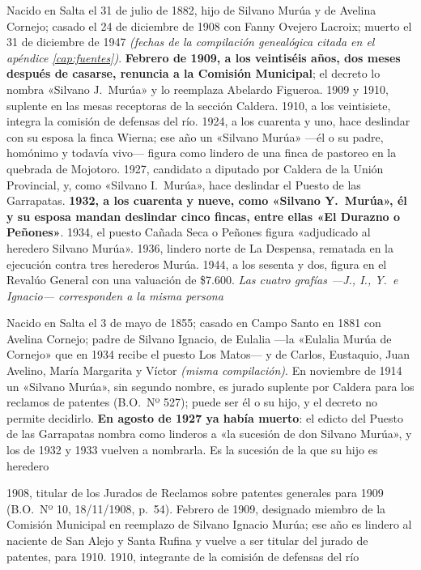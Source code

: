 \begin{personas}
\item[{\textbf{Silvano Ignacio Murúa\index{Murúa, Silvano Ignacio}}}] Nacido en Salta el 31 de julio de 1882, hijo de Silvano Murúa y de Avelina Cornejo; casado el 24 de diciembre de 1908 con Fanny Ovejero Lacroix; muerto el 31 de diciembre de 1947 \textit{(fechas de la compilación genealógica citada en el apéndice \ref{cap:fuentes})}. \textbf{Febrero de 1909, a los veintiséis años, dos meses después de casarse, renuncia a la Comisión Municipal}; el decreto lo nombra «Silvano J.\ Murúa» y lo reemplaza Abelardo Figueroa. 1909 y 1910, suplente en las mesas receptoras de la sección Caldera. 1910, a los veintisiete, integra la comisión de defensas del río. 1924, a los cuarenta y uno, hace deslindar con su esposa la finca Wierna; ese año un «Silvano Murúa» ---él o su padre, homónimo y todavía vivo--- figura como lindero de una finca de pastoreo en la quebrada de Mojotoro. 1927, candidato a diputado por Caldera de la Unión Provincial, y, como «Silvano I.\ Murúa», hace deslindar el Puesto de las Garrapatas. \textbf{1932, a los cuarenta y nueve, como «Silvano Y.\ Murúa», él y su esposa mandan deslindar cinco fincas, entre ellas «El Durazno o Peñones»}. 1934, el puesto Cañada Seca o Peñones figura «adjudicado al heredero Silvano Murúa». 1936, lindero norte de La Despensa, rematada en la ejecución contra tres herederos Murúa. 1944, a los sesenta y dos, figura en el Revalúo General con una valuación de \$7.600. \textit{Las cuatro grafías ---J., I., Y.\ e Ignacio--- corresponden a la misma persona}

\item[{\textbf{Silvano Murúa\index{Murúa, Silvano}} \textit{(padre)}}] Nacido en Salta el 3 de mayo de 1855; casado en Campo Santo en 1881 con Avelina Cornejo; padre de Silvano Ignacio, de Eulalia ---la «Eulalia Murúa de Cornejo» que en 1934 recibe el puesto Los Matos--- y de Carlos, Eustaquio, Juan Avelino, María Margarita y Víctor \textit{(misma compilación)}. En noviembre de 1914 un «Silvano Murúa», sin segundo nombre, es jurado suplente por Caldera para los reclamos de patentes (B.O.\ Nº 527); puede ser él o su hijo, y el decreto no permite decidirlo. \textbf{En agosto de 1927 ya había muerto}: el edicto del Puesto de las Garrapatas nombra como linderos a «la sucesión de don Silvano Murúa», y los de 1932 y 1933 vuelven a nombrarla. Es la sucesión de la que su hijo es heredero

\item[{\textbf{Abelardo Figueroa\index{Figueroa, Abelardo}}}] 1908, titular de los Jurados de Reclamos sobre patentes generales para 1909 (B.O.\ Nº 10, 18/11/1908, p.\ 54). Febrero de 1909, designado miembro de la Comisión Municipal en reemplazo de Silvano Ignacio Murúa; ese año es lindero al naciente de San Alejo y Santa Rufina y vuelve a ser titular del jurado de patentes, para 1910. 1910, integrante de la comisión de defensas del río


\end{personas}
